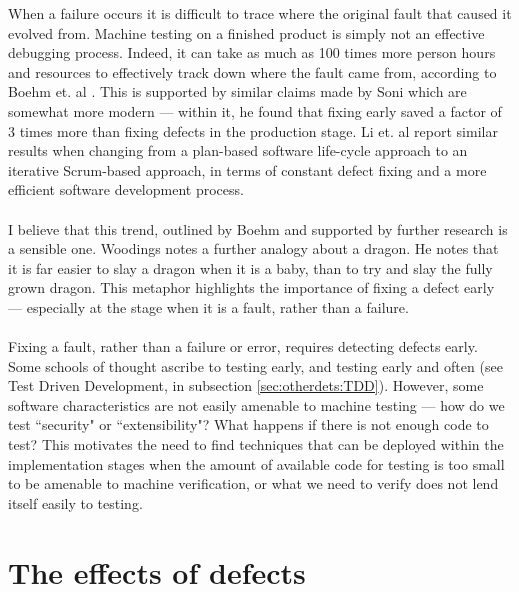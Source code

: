 When a failure occurs it is difficult to trace where the original fault that caused it evolved from.
Machine testing on a finished product is simply not an effective debugging process.
Indeed, it can take as much as 100 times more person hours and resources to effectively track down
where the fault came from, according to Boehm et. al \cite{boehm2005foundations}.
This is supported by similar claims made by Soni \cite{soni2006defect} which are somewhat more
modern --- within it, he found that fixing early saved a factor of 3 times more than fixing defects
in the production stage.
Li et. al \cite{li2010transition} report similar results when changing from a plan-based software
life-cycle approach to an iterative Scrum-based approach, in terms of constant defect fixing and a
more efficient software development process.\\
\\
I believe that this trend, outlined by Boehm and supported by further research is a sensible one.
Woodings \cite{terryLectureCITS4220} notes a further analogy about a dragon.
He notes that it is far easier to slay a dragon when it is a baby, than to try and slay the fully
grown dragon.
This metaphor highlights the importance of fixing a defect early --- especially at the stage when it
is a fault, rather than a failure.\\
\\
Fixing a fault, rather than a failure or error, requires detecting defects early.
Some schools of thought ascribe to testing early, and testing early and often (see Test Driven Development, in
subsection \ref{sec:otherdets:TDD}).
However, some software characteristics are not easily amenable to machine testing --- how do we test
``security" or ``extensibility"?
What happens if there is not enough code to test?
This motivates the need to find techniques that can be deployed within the implementation stages
when the amount of available code for testing is too small to be amenable to machine verification,
or what we need to verify does not lend itself easily to testing.

\section{The effects of defects} \label{sec:defects:defEffects}

